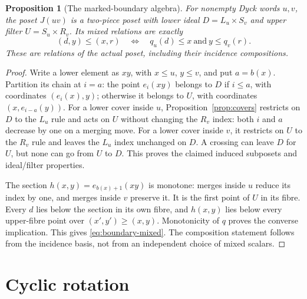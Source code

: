 \documentclass[11pt]{article}
\newtheorem{proposition}[theorem]{Proposition}
\theoremstyle{definition}
\begin{document}
\begin{proposition}[The marked-boundary algebra]\label{prop:boundary-algebra}
For nonempty Dyck words $u,v$, the poset $J(uv)$ is a two-piece
poset with lower ideal $D=L_u\times S_v$ and upper filter
$U=S_u\times R_v$. Its mixed relations are exactly
\begin{equation}\label{eq:boundary-mixed}
 (d,y)\leq(x,r)\quad\Longleftrightarrow\quad
 q_u(d)\leq x\ \text{and}\ y\leq q_v(r).
\end{equation}
These are relations of the actual poset, including their incidence
compositions.
\end{proposition}
\begin{proof}
Write a lower element as $xy$, with $x\leq u$, $y\leq v$, and put
$a=b(x)$. Partition its chain at $i=a$: the point $e_i(xy)$ belongs
to $D$ if $i\leq a$, with coordinates $(e_i(x),y)$; otherwise it
belongs to $U$, with coordinates $(x,e_{i-a}(y))$.
For a lower cover inside $u$, Proposition~\ref{prop:covers} restricts
on $D$ to the $L_u$ rule and acts on $U$ without changing the
$R_v$ index: both $i$ and $a$ decrease by one on a merging move.
For a lower cover inside $v$, it restricts on $U$ to the $R_v$ rule
and leaves the $L_u$ index unchanged on $D$. A crossing can leave
$D$ for $U$, but none can go from $U$ to $D$. This proves the
claimed induced subposets and ideal/filter properties.

The section $h(x,y)=e_{b(x)+1}(xy)$ is monotone: merges inside $u$
reduce its index by one, and merges inside $v$ preserve it. It is
the first point of $U$ in its fibre. Every $d$ lies below the
section in its own fibre, and $h(x,y)$ lies below every upper-fibre
point over $(x',y')\geq(x,y)$. Monotonicity of $q$ proves the
converse implication. This gives \eqref{eq:boundary-mixed}.
The composition statement follows from the incidence basis, not
from an independent choice of mixed scalars.
\end{proof}



\section{Cyclic rotation}
\label{sec:rotation}
\end{document}
